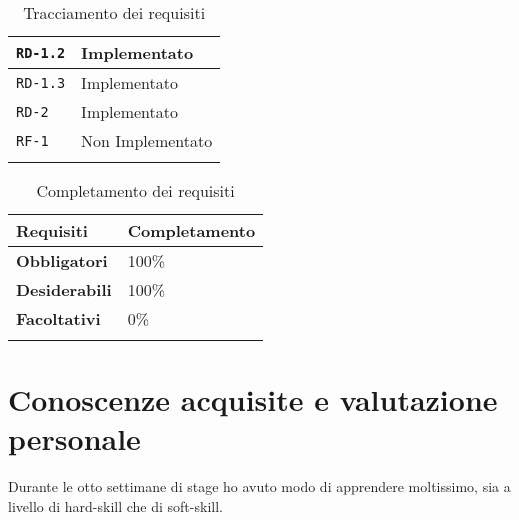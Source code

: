 \begin{center}
\begin{longtable}{| C{2.5cm} | C{4cm} |}
		\texttt{RD-1.2} & Implementato \\
		
		\hline 
		
		\texttt{RD-1.3} & Implementato  \\	
	
		\hline 
		
		\texttt{RD-2} & Implementato  \\
		
		\hline 
		
		\texttt{RF-1} & Non Implementato \\
		
		\hline 
		
		\caption{Tracciamento dei requisiti}\label{tab:tracciamento}
	\end{longtable}
	
	
\end{center}

\begin{center}
	
	\renewcommand{\arraystretch}{1.5}
	
	\centering
	\begin{longtable}{| C{2.5cm} | C{4cm} |}
		
		\hline
		
		\textbf{Requisiti} &  \textbf{Completamento} \\
		
		\hline
		
		\textbf{Obbligatori} & 100\% \\
		
		\hline 
		
		\textbf{Desiderabili} & 100\% \\
		
		\hline 
		
		\textbf{Facoltativi} & 0\% \\
		
		\hline 
		
		\caption{Completamento dei requisiti}\label{tab:completamento}
	\end{longtable}
	
	
\end{center}

\section{Conoscenze acquisite e valutazione personale}
Durante le otto settimane di stage ho avuto modo di apprendere moltissimo, sia a livello di hard-skill che di soft-skill.


